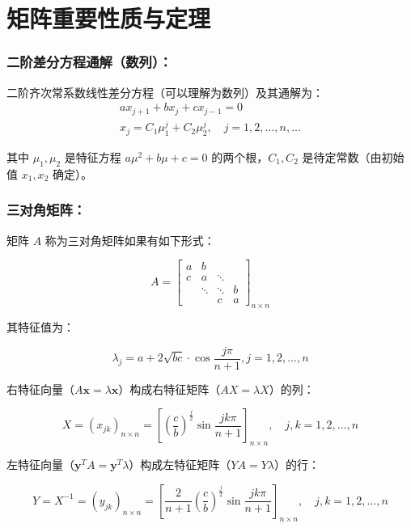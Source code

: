 \documentclass[zihao=5,UTF8]{report}
\theoremstyle{MyTheoremStyle} %
\theoremstyle{MySubsubsectionStyle} %
\begin{document}
\section{矩阵重要性质与定理}

\subsubsection{二阶差分方程通解（数列）：}

二阶齐次常系数线性差分方程（可以理解为数列）及其通解为：
\begin{gather*}
ax_{j+1}+bx_j+cx_{j-1}=0 \\ 
x_j=C_1\mu_1^j+C_2\mu_2^j,\quad j=1,2,..., n, ...
\end{gather*}

其中 $\mu_1, \mu_2$ 是特征方程 $a\mu^2 + b\mu + c = 0$ 的两个根，$C_1, C_2$ 是待定常数（由初始值 $x_1, x_2$ 确定）。


\subsubsection{三对角矩阵：}

矩阵 $A$ 称为三对角矩阵如果有如下形式：


\begin{equation*}
A = 
\begin{bmatrix}
    a&b\\c&a&\ddots\\&\ddots&\ddots&b\\&&c&a
\end{bmatrix}_{n \times n}
\end{equation*}

其特征值为：

\begin{equation*}
    \lambda_j=a+2\sqrt{bc}\cdot\cos\frac{j\pi}{n+1}, j=1,2,...,n
\end{equation*}

右特征向量（$A \boldsymbol{x} = \lambda \boldsymbol{x}$）构成右特征矩阵（$AX = \lambda X$）的列：

\begin{equation*}
    X=(x_{jk})_{n\times n} = \left[\left(\frac{c}{b}\right)^{\frac{j}{2}}\sin\frac{jk\pi}{n+1}\right]_{n\times n},\quad j,k=1,2,...,n
\end{equation*}

左特征向量（$\boldsymbol{y}^TA  =  \boldsymbol{y}^T\lambda$）构成左特征矩阵（$YA = Y\lambda $）的行：

\begin{equation*}
    Y = X^{-1}=(y_{jk})_{n\times n} = \left[\frac{2}{n+1}\left(\frac{c}{b}\right)^{\frac{j}{2}}\sin\frac{jk\pi}{n+1}\right]_{n\times n},\quad j,k=1,2,...,n
\end{equation*}
\end{document}
